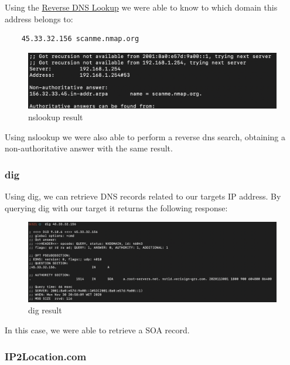 Using the \href{https://hackertarget.com/reverse-dns-lookup/}{Reverse DNS Lookup} we were able to know to which domain this address belongs to: 

\begin{lstlisting}
    45.33.32.156 scanme.nmap.org
\end{lstlisting}

\begin{figure}[ht!]
 	\centering
 	\includegraphics[width=1\linewidth]{img/nsl3.png}
 	\caption{nslookup result}
\end{figure}

Using nslookup we were also able to perform a reverse dns search, obtaining a non-authoritative answer with the same result.

\vspace{0.5cm}

\subsubsection{dig}

Using dig, we can retrieve DNS records related to our targets IP address. By querying dig with our target it returns the following response:

\begin{figure}[ht!]
 	\centering
 	\includegraphics[width=1\linewidth]{img/dig3.png}
 	\caption{dig result}
 \end{figure}

In this case, we were able to retrieve a SOA record.

\vspace{0.5cm}

\subsubsection{IP2Location.com}

